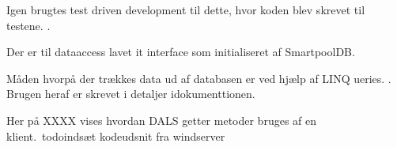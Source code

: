 Igen brugtes test driven development til dette, hvor koden blev skrevet til testene.  .

Der er til dataaccess lavet it interface som initialiseret af SmartpoolDB.

Måden hvorpå der trækkes data ud af databasen er ved hjælp af LINQ ueries. . Brugen heraf er skrevet i detaljer idokumenttionen.

Her på XXXX vises hvordan DALS getter metoder bruges af en klient.\ todo{indsæt kodeudsnit fra windserver}